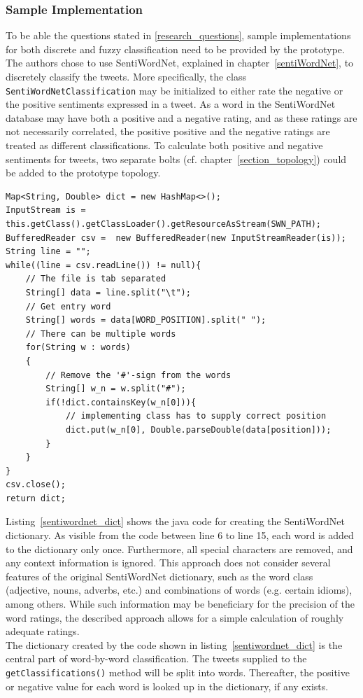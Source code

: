 \documentclass[a4paper]{article}
\begin{document}
\subsubsection{Sample Implementation}
To be able the questions stated in \ref{research_questions}, sample implementations for both discrete and fuzzy classification need to be provided by the prototype. The authors chose to use SentiWordNet, explained in chapter~\ref{sentiWordNet}, to discretely classify the tweets. More specifically, the class \texttt{SentiWordNetClassification} may be initialized to either rate the negative or the positive sentiments expressed in a tweet. As a word in the SentiWordNet database may have both a positive and a negative rating, and as these ratings are not necessarily correlated, the positive positive and the negative ratings are treated as different classifications. To calculate both positive and negative sentiments for tweets, two separate bolts (cf. chapter~\ref{section_topology}) could be added to the prototype topology.\\

\begin{lstlisting}
Map<String, Double> dict = new HashMap<>();
InputStream is = this.getClass().getClassLoader().getResourceAsStream(SWN_PATH);
BufferedReader csv =  new BufferedReader(new InputStreamReader(is));
String line = "";
while((line = csv.readLine()) != null){
	// The file is tab separated
	String[] data = line.split("\t");
	// Get entry word
	String[] words = data[WORD_POSITION].split(" ");
	// There can be multiple words
	for(String w : words)
	{
		// Remove the '#'-sign from the words
		String[] w_n = w.split("#");
		if(!dict.containsKey(w_n[0])){
			// implementing class has to supply correct position
			dict.put(w_n[0], Double.parseDouble(data[position]));
		}
	}
}
csv.close();
return dict;
\end{lstlisting}

Listing~\ref{sentiwordnet_dict} shows the java code for creating the SentiWordNet dictionary. As visible from the code between line 6 to line 15, each word is added to the dictionary only once. Furthermore, all special characters are removed, and any context information is ignored. This approach does not consider several features of the original SentiWordNet dictionary, such as the word class (adjective, nouns, adverbs, etc.) and combinations of words (e.g. certain idioms), among others. While such information may be beneficiary for the precision of the word ratings, the described approach allows for a simple calculation of roughly adequate ratings. \\
The dictionary created by the code shown in listing~\ref{sentiwordnet_dict} is the central part of word-by-word classification. The tweets supplied to the \texttt{getClassifications()} method will be split into words. Thereafter, the positive or negative value for each word is looked up in the dictionary, if any exists.
\end{document}
